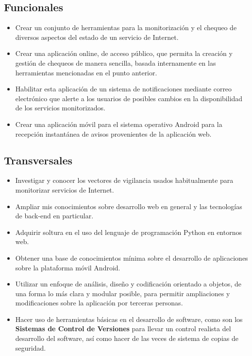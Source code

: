 \subsection{Funcionales}
\begin{itemize}
\item Crear un conjunto de herramientas para la monitorización y el chequeo de
  diversos aspectos del estado de un servicio de Internet.
\item Crear una aplicación online, de acceso público, que permita la creación y
  gestión de chequeos de manera sencilla, basada internamente en las
  herramientas mencionadas en el punto anterior.
\item Habilitar esta aplicación de un sistema de notificaciones mediante correo
  electrónico que alerte a los usuarios de posibles cambios en la disponibilidad
  de los servicios monitorizados.
\item Crear una aplicación móvil para el sistema operativo Android para la
  recepción instantánea de avisos provenientes de la aplicación web.
\end{itemize}

\subsection{Transversales}
\begin{itemize}
\item Investigar y conocer los vectores de vigilancia usados habitualmente para
  monitorizar servicios de Internet.
\item Ampliar mis conocimientos sobre desarrollo web en general y las
  tecnologías de back-end en particular.
\item Adquirir soltura en el uso del lenguaje de programación Python en entornos
  web.
\item Obtener una base de conocimientos mínima sobre el desarrollo de
  aplicaciones sobre la plataforma móvil Android.
\item Utilizar un enfoque de análisis, diseño y codificación orientado
  a objetos, de una forma lo más clara y modular posible, para
  permitir ampliaciones y modificaciones sobre la aplicación por
  terceras personas.
\item Hacer uso de herramientas básicas en el desarrollo de software,
  como son los \textbf{Sistemas de Control de Versiones} para llevar
  un control realista del desarrollo del software, así como hacer de
  las veces de sistema de copias de seguridad.
\end{itemize}


